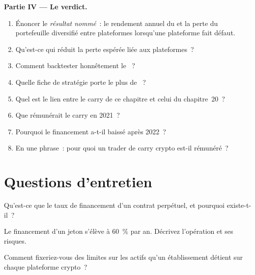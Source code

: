 \begin{problem}
\medskip\noindent\textbf{Partie IV --- Le verdict.}
\begin{enumerate}[resume]
\item Énoncer le \emph{résultat nommé}~: le rendement annuel du  et la perte du portefeuille diversifié entre plateformes lorsqu'une plateforme fait défaut.
\item Qu'est-ce qui réduit la perte espérée liée aux plateformes~?
\item Comment backtester honnêtement le ~?
\item Quelle fiche de stratégie porte le plus de ~?
\item Quel est le lien entre le carry de ce chapitre et celui du chapitre~20~?
\item Que rémunérait le carry en 2021~?
\item Pourquoi le financement a-t-il baissé après 2022~?
\item En une phrase~: pour quoi un trader de carry crypto est-il rémunéré~?
\end{enumerate}
\end{problem}

\section{Questions d'entretien}

\begin{interviewq}\label{iq:s1:crypto-medium-frequency-strategies:1}
Qu'est-ce que le taux de financement d'un contrat perpétuel, et pourquoi existe-t-il~?
\end{interviewq}

\begin{interviewq}\label{iq:s1:crypto-medium-frequency-strategies:2}
Le financement d'un jeton s'élève à 60~\% par an. Décrivez l'opération et ses risques.
\end{interviewq}

\begin{interviewq}\label{iq:s1:crypto-medium-frequency-strategies:3}
Comment fixeriez-vous des limites sur les actifs qu'un établissement détient sur chaque plateforme crypto~?
\end{interviewq}

